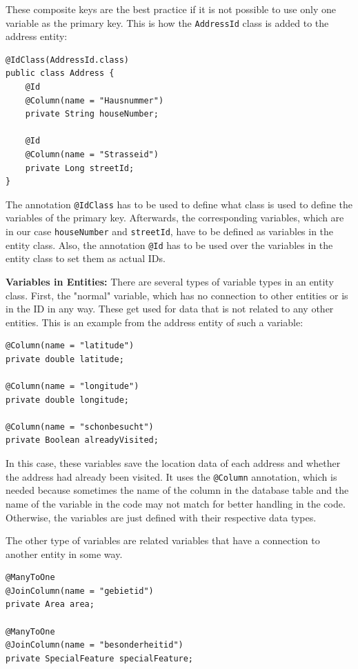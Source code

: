     These composite keys are the best practice if it is not possible to use only one variable as the primary key. This is how the \texttt{AddressId} class is added to the address entity: 
    \lstset{style=java, caption=IDs in Address-Entity}
    \begin{verbatim}
@IdClass(AddressId.class)
public class Address {
    @Id
    @Column(name = "Hausnummer")
    private String houseNumber;

    @Id
    @Column(name = "Strasseid")
    private Long streetId;
}                         
    \end{verbatim} 
    The annotation \texttt{@IdClass} has to be used to define what class is used to define the variables of the primary key. Afterwards, the corresponding variables, which are in our case \texttt{houseNumber} and \texttt{streetId}, have to be defined as variables in the entity class. Also, the annotation \texttt{@Id} has to be used over the variables in the entity class to set them as actual IDs. \newline 

    \textbf{Variables in Entities:} \newline
    There are several types of variable types in an entity class. First, the "normal" variable, which has no connection to other entities or is in the ID in any way. These get used for data that is not related to any other entities. This is an example from the address entity of such a variable:
    \lstset{style=java, caption="Normal" Variable}
    \begin{verbatim}
@Column(name = "latitude")
private double latitude;
    
@Column(name = "longitude")
private double longitude;
    
@Column(name = "schonbesucht")
private Boolean alreadyVisited;                     
    \end{verbatim} 
    In this case, these variables save the location data of each address and whether the address had already been visited. It uses the \texttt{@Column} annotation, which is needed because sometimes the name of the column in the database table and the name of the variable in the code may not match for better handling in the code. Otherwise, the variables are just defined with their respective data types. \newline

    The other type of variables are related variables that have a connection to another entity in some way.
    \lstset{style=java, caption=ManyToOne Variable}
    \begin{verbatim}
@ManyToOne
@JoinColumn(name = "gebietid")
private Area area;
    
@ManyToOne
@JoinColumn(name = "besonderheitid")
private SpecialFeature specialFeature;                    
    \end{verbatim} 

